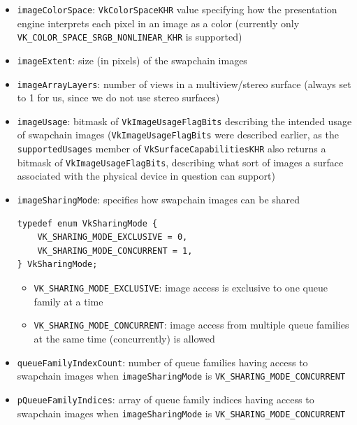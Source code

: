 \documentclass[12pt,letterpaper]{article}
\newcommand{\cil}[1]{\texttt{#1}}
\begin{document}
\begin{itemize}
        \item \cil{imageColorSpace}: \cil{VkColorSpaceKHR} value specifying how the presentation engine interprets each pixel in an image as a color (currently only \cil{VK_COLOR_SPACE_SRGB_NONLINEAR_KHR} is supported) 
        
        \item \cil{imageExtent}: size (in pixels) of the swapchain images
        
        \item \cil{imageArrayLayers}: number of views in a multiview/stereo surface (always set to 1 for us, since we do not use stereo surfaces)
        
        \item \cil{imageUsage}: bitmask of \cil{VkImageUsageFlagBits} describing the intended usage of swapchain images (\cil{VkImageUsageFlagBits} were described earlier, as the \cil{supportedUsages} member of \cil{VkSurfaceCapabilitiesKHR} also returns a bitmask of \cil{VkImageUsageFlagBits}, describing what sort of images a surface associated with the physical device in question can support)
        
        \item \cil{imageSharingMode}: specifies how swapchain images can be shared
        \begin{verbatim}
typedef enum VkSharingMode {
    VK_SHARING_MODE_EXCLUSIVE = 0,
    VK_SHARING_MODE_CONCURRENT = 1,
} VkSharingMode;
        \end{verbatim}
            \begin{itemize}
                \item \cil{VK_SHARING_MODE_EXCLUSIVE}: image access is exclusive to one queue family at a time
                
                \item \cil{VK_SHARING_MODE_CONCURRENT}: image access from multiple queue families at the same time (concurrently) is allowed
            \end{itemize}
        
        \item \cil{queueFamilyIndexCount}: number of queue families having access to swapchain images when \cil{imageSharingMode} is \cil{VK_SHARING_MODE_CONCURRENT}
        
        \item \cil{pQueueFamilyIndices}: array of queue family indices having access to swapchain images when \cil{imageSharingMode} is \cil{VK_SHARING_MODE_CONCURRENT}
        

\end{itemize}
\end{document}

